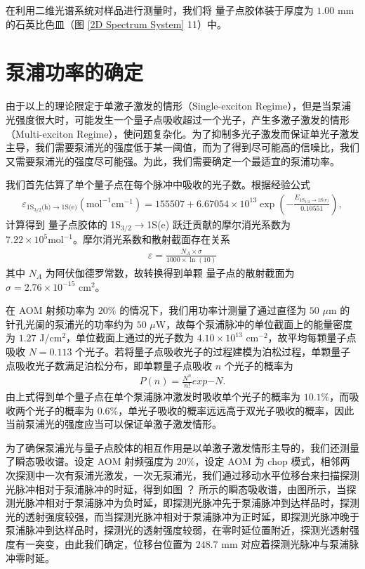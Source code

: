 \documentclass{thesis}
\begin{document}
在利用二维光谱系统对样品进行测量时，我们将  量子点胶体装于厚度为 $1.00$ mm 的石英比色皿（图 \ref{2D Spectrum System} \textcircled{\footnotesize{11}}）中。

\section{泵浦功率的确定}
由于以上的理论限定于单激子激发的情形（Single-exciton Regime），但是当泵浦光强度很大时，可能发生一个量子点吸收超过一个光子，产生多激子激发的情形（Multi-exciton Regime），使问题复杂化。为了抑制多光子激发而保证单光子激发主导，我们需要泵浦光的强度低于某一阈值，而为了得到尽可能高的信噪比，我们又需要泵浦光的强度尽可能强。为此，我们需要确定一个最适宜的泵浦功率。

我们首先估算了单个量子点在每个脉冲中吸收的光子数。根据经验公式\cite{jasieniak2009re}
\begin{align}
    \varepsilon_{\text{1S}_{3/2}\text{(h)}\rightarrow\text{1S(e)}}(\text{mol}^{-1}\text{cm}^{-1})=155507+6.67054\times 10^{13}\exp\left(-\frac{E_{\text{1S}_{3/2}\rightarrow\text{1S(e)}}}{0.10551}\right),
\end{align}
计算得到  量子点胶体的 1S$_{3/2}\rightarrow$1S(e) 跃迁贡献的摩尔消光系数为 $7.22\times 10^5\text{mol}^{-1}$。摩尔消光系数和散射截面存在关系\cite{jasieniak2009re}
\begin{align}
    \varepsilon=\frac{N_A\times\sigma}{1000\times\ln(10)}
\end{align}
其中 $N_A$ 为阿伏伽德罗常数，故转换得到单颗  量子点的散射截面为 $\sigma=2.76\times 10^{-15}$ cm$^2$。

在 AOM 射频功率为 $20\%$ 的情况下，我们用功率计测量了通过直径为 $50$ $\mu$m 的针孔光阑的泵浦光的功率约为 $50$ $\mu$W，故每个泵浦脉冲的单位截面上的能量密度为 $1.27$ J/cm$^2$，单位截面上通过的光子数为 $4.10\times 10^{13}$ cm$^{-2}$，故平均每颗量子点吸收 $N=0.113$ 个光子。若将量子点吸收光子的过程建模为泊松过程，单颗量子点吸收光子数满足泊松分布，即单颗量子点吸收 $n$ 个光子的概率为
\begin{align}
    P(n)=\frac{N^n}{n!}exp{-N}.
\end{align}
由上式得到单个量子点在单个泵浦脉冲激发时吸收单个光子的概率为 $10.1\%$，而吸收两个光子的概率为 $0.6\%$，单光子吸收的概率远远高于双光子吸收的概率，因此当前泵浦光的强度应当可以保证单激子激发情形。

为了确保泵浦光与量子点胶体的相互作用是以单激子激发情形主导的，我们还测量了瞬态吸收谱。设定 AOM 射频强度为 $20\%$，设定 AOM 为 chop 模式，相邻两次探测中一次有泵浦光激发，一次无泵浦光，我们通过移动水平位移台来扫描探测光脉冲相对于泵浦脉冲的时延，得到如图 ？ 所示的瞬态吸收谱，由图所示，当探测光脉冲相对于泵浦脉冲为负时延，即探测光脉冲先于泵浦脉冲到达样品时，探测光的透射强度较强，而当探测光脉冲相对于泵浦脉冲为正时延，即探测光脉冲晚于泵浦脉冲到达样品时，探测光的透射强度较弱，在零时延位置附近，探测光透射强度有一突变，由此我们确定，位移台位置为 $248.7$ mm 对应着探测光脉冲与泵浦脉冲零时延。
\end{document}
